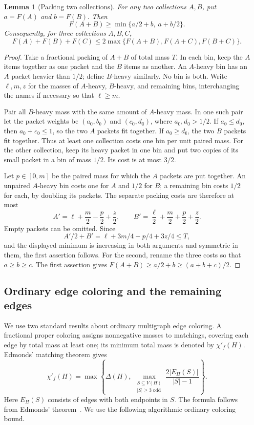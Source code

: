 \documentclass[11pt]{article}
\newtheorem{lemma}[theorem]{Lemma}
\theoremstyle{definition}\newtheorem{algorithm}{Algorithm}[section]
\numberwithin{equation}{section}
\theoremstyle{remark}\newtheorem*{remark}{Remark}
\begin{document}
\begin{lemma}[Packing two collections]\label{lem:general-two-bags}
For any two collections $A,B$, put $a=F(A)$ and $b=F(B)$. Then
\[
 F(A+B)\ge\min\{a/2+b,\ a+b/2\}.
\]
Consequently, for three collections $A,B,C$,
\[
 F(A)+F(B)+F(C)
 \le2\max\{F(A+B),F(A+C),F(B+C)\}.
\]
\end{lemma}
\begin{proof}
Take a fractional packing of $A+B$ of total mass $T$. In each bin,
keep the $A$ items together as one packet and the $B$ items as another.
An $A$-heavy bin has an $A$ packet heavier than $1/2$; define
$B$-heavy similarly. No bin is both. Write $\ell,m,z$ for the masses
of $A$-heavy, $B$-heavy, and remaining bins, interchanging the names
if necessary so that $\ell\ge m$.

Pair all $B$-heavy mass with the same amount of $A$-heavy mass.
In one such pair let the packet weights be $(a_0,b_0)$ and
$(c_0,d_0)$, where $a_0,d_0>1/2$. If $a_0\le d_0$, then
$a_0+c_0\le1$, so the two $A$ packets fit together. If
$a_0\ge d_0$, the two $B$ packets fit together. Thus at least one
collection costs one bin per unit paired mass. For the other
collection, keep its heavy packet in one bin and put two copies of
its small packet in a bin of mass $1/2$. Its cost is at most $3/2$.

Let $p\in[0,m]$ be the paired mass for which the $A$ packets are put
together. An unpaired $A$-heavy bin costs one for $A$ and $1/2$ for
$B$; a remaining bin costs $1/2$ for each, by doubling its packets.
The separate packing costs are therefore at most
\[
 A'=\ell+\frac m2-\frac p2+\frac z2,
 \qquad B'=\frac\ell2+\frac m2+\frac p2+\frac z2.
\]
Empty packets can be omitted. Since
\[
 A'/2+B'=\ell+3m/4+p/4+3z/4\le T,
\]
and the displayed minimum is increasing in both arguments and
symmetric in them, the first assertion follows. For the second,
rename the three costs so that $a\ge b\ge c$. The first assertion
gives $F(A+B)\ge a/2+b\ge(a+b+c)/2$.
\end{proof}

\subsection{Ordinary edge coloring and the remaining edges}

We use two standard results about ordinary multigraph edge coloring.
A fractional proper coloring assigns nonnegative masses to matchings,
covering each edge by total mass at least one; its minimum total mass
is denoted by $\chi'_f(H)$. Edmonds' matching theorem gives
\begin{equation}\label{eq:general-fractional-index}
 \chi'_f(H)=\max\left\{\Delta(H),\
   \max_{\substack{S\subseteq V(H)\\ |S|\ge3\text{ odd}}}
       \frac{2|E_H(S)|}{|S|-1}\right\}.
\end{equation}
Here $E_H(S)$ consists of edges with both endpoints in $S$.
The formula follows from Edmonds' theorem~\cite{Edmonds65}.
We use the following algorithmic ordinary coloring bound.
\end{document}
